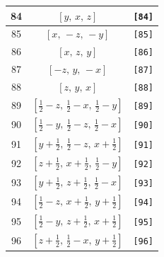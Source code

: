 \documentclass[fleqn,8pt]{jsarticle}
\begin{document}
\begin{longtable}{ccc}
84 & $\left[ y,\, x,\, z \right]$ & {\tt [84]} \\ \hline
85 & $\left[ x,\, - z,\, - y \right]$ & {\tt [85]} \\ \hline
86 & $\left[ x,\, z,\, y \right]$ & {\tt [86]} \\ \hline
87 & $\left[ - z,\, y,\, - x \right]$ & {\tt [87]} \\ \hline
88 & $\left[ z,\, y,\, x \right]$ & {\tt [88]} \\ \hline
89 & $\left[ \frac{1}{2} - z,\, \frac{1}{2} - x,\, \frac{1}{2} - y \right]$ & {\tt [89]} \\ \hline
90 & $\left[ \frac{1}{2} - y,\, \frac{1}{2} - z,\, \frac{1}{2} - x \right]$ & {\tt [90]} \\ \hline
91 & $\left[ y + \frac{1}{2},\, \frac{1}{2} - z,\, x + \frac{1}{2} \right]$ & {\tt [91]} \\ \hline
92 & $\left[ z + \frac{1}{2},\, x + \frac{1}{2},\, \frac{1}{2} - y \right]$ & {\tt [92]} \\ \hline
93 & $\left[ y + \frac{1}{2},\, z + \frac{1}{2},\, \frac{1}{2} - x \right]$ & {\tt [93]} \\ \hline
94 & $\left[ \frac{1}{2} - z,\, x + \frac{1}{2},\, y + \frac{1}{2} \right]$ & {\tt [94]} \\ \hline
95 & $\left[ \frac{1}{2} - y,\, z + \frac{1}{2},\, x + \frac{1}{2} \right]$ & {\tt [95]} \\ \hline
96 & $\left[ z + \frac{1}{2},\, \frac{1}{2} - x,\, y + \frac{1}{2} \right]$ & {\tt [96]} \\
\end{longtable}
\end{document}
